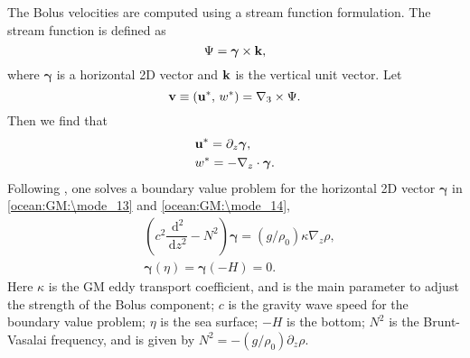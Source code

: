 The Bolus velocities are computed using a stream function formulation.  The stream function is defined as
\begin{equation}
  \label{ocean:GM:\mode_10}
  \Psi = \boldsymbol{\gamma}\times{\bf k},
\end{equation}
where $\boldsymbol{\gamma}$ is a horizontal 2D vector and ${\bf k}$ is the
vertical unit vector. Let 
\begin{equation}
  \label{ocean:GM:\mode_2}
  {\bf v} \equiv ({\bf u}^\ast,\,w^\ast) = \nabla_3 \times\Psi.
\end{equation}
Then we find that 
\begin{align}
  &{\bf u}^\ast = \partial_z\boldsymbol{\gamma},\label{ocean:GM:\mode_13}\\
 &w^\ast = -\nabla_z\cdot\boldsymbol{\gamma}.\label{ocean:GM:\mode_14}
\end{align}
Following \cite{Ferrari_ea10om}, one solves a boundary value
problem for the horizontal 2D vector
$\boldsymbol{\gamma}$ in \eqref{ocean:GM:\mode_13} and \eqref{ocean:GM:\mode_14},
\begin{align}
  &\left( c^2\dfrac{\,\mathrm{d}^2}{\,\mathrm{d} z^2} - N^2\right)\boldsymbol{\gamma} =
  (g/\rho_0)\kappa \nabla_z\rho,\label{ocean:GM:\mode_15}\\
  &\boldsymbol{\gamma}(\eta) = \boldsymbol{\gamma}(-H) = 0.\label{ocean:GM:\mode_3}
\end{align}
Here $\kappa$ is the GM eddy transport coefficient, and is the main parameter to adjust the strength of the Bolus component; $c$ is the gravity wave speed for the boundary value problem; $\eta$ is the sea surface; $-H$ is the bottom; $N^2$ is the Brunt-Vasalai frequency, and is given by $N^2 = -(g/\rho_0)\partial_z\rho$. 
